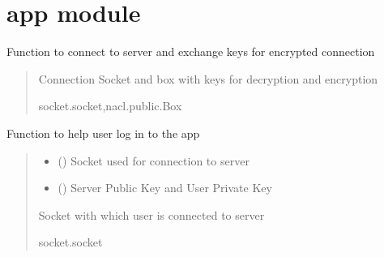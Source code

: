 \documentclass[letterpaper,10pt,english]{sphinxmanual}
\begin{document}
\sphinxstepscope


\section{app module}
\label{\detokenize{app:module-app}}\label{\detokenize{app:app-module}}\label{\detokenize{app::doc}}

\begin{fulllineitems}
\label{\detokenize{app:app.connectToServer}}
\pysigstartsignatures
{}
\pysigstopsignatures
\sphinxAtStartPar
Function to connect to server and exchange keys for encrypted connection
\begin{quote}\begin{description}
\sphinxAtStartPar
Connection Socket and box with keys for decryption and encryption

\sphinxAtStartPar
socket.socket,nacl.public.Box

\end{description}\end{quote}

\end{fulllineitems}


\begin{fulllineitems}
\label{\detokenize{app:app.login}}
\pysigstartsignatures
{}
\pysigstopsignatures
\sphinxAtStartPar
Function to help user log in to the app
\begin{quote}\begin{description}
\begin{itemize}
\item {} 
\sphinxAtStartPar
{} () \textendash{} Socket used for connection to server

\item {} 
\sphinxAtStartPar
{} () \textendash{} Server Public Key and User Private Key

\end{itemize}

\sphinxAtStartPar
Socket with which user is connected to server

\sphinxAtStartPar
socket.socket

\end{description}\end{quote}

\end{fulllineitems}
\end{document}
